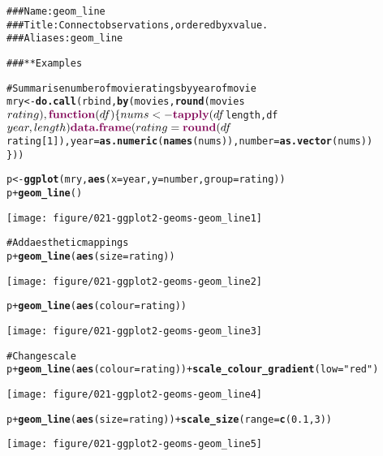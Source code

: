 \documentclass[a4paper,titlepage]{tufte-handout}\usepackage{graphicx, color}
\makeatletter
\def\maxwidth{ %
  \ifdim\Gin@nat@width>\linewidth
    \linewidth
  \else
    \Gin@nat@width
  \fi
}
\newcommand{\hlfunctioncall}[1]{\textcolor[rgb]{0.501960784313725,0,0.329411764705882}{\textbf{#1}}}%
\newcommand{\hlstring}[1]{\textcolor[rgb]{0.6,0.6,1}{#1}}%
\newcommand{\hlcomment}[1]{\textcolor[rgb]{0.180392156862745,0.6,0.341176470588235}{#1}}%
\newenvironment{kframe}{%
 \def\at@end@of@kframe{}%
 \ifinner\ifhmode%
  \def\at@end@of@kframe{\end{minipage}}%
  \begin{minipage}{\columnwidth}%
 \fi\fi%
 \def\FrameCommand##1{\hskip\@totalleftmargin \hskip-\fboxsep
 \colorbox{shadecolor}{##1}\hskip-\fboxsep
     \hskip-\linewidth \hskip-\@totalleftmargin \hskip\columnwidth}%
 \MakeFramed {\advance\hsize-\width
   \@totalleftmargin\z@ \linewidth\hsize
   \@setminipage}}%
 {\par\unskip\endMakeFramed%
 \at@end@of@kframe}
\newenvironment{knitrout}{}{} %
\makeatother
\begin{document}
\begin{knitrout}
\color{fgcolor}\begin{kframe}
\begin{alltt}
\hlcomment{### Name: geom_line}
\hlcomment{### Title: Connect observations, ordered by x value.}
\hlcomment{### Aliases: geom_line}

\hlcomment{### ** Examples}

\hlcomment{# Summarise number of movie ratings by year of movie}
mry <- \hlfunctioncall{do.call}(rbind, \hlfunctioncall{by}(movies, \hlfunctioncall{round}(movies$rating), \hlfunctioncall{function}(df) \{
  nums <- \hlfunctioncall{tapply}(df$length, df$year, length)
  \hlfunctioncall{data.frame}(rating=\hlfunctioncall{round}(df$rating[1]), year = \hlfunctioncall{as.numeric}(\hlfunctioncall{names}(nums)), number=\hlfunctioncall{as.vector}(nums))
\}))

p <- \hlfunctioncall{ggplot}(mry, \hlfunctioncall{aes}(x=year, y=number, group=rating))
p + \hlfunctioncall{geom_line}()
\end{alltt}
\end{kframe}
\texttt{[image: figure/021-ggplot2-geoms-geom\_line1]} 
\begin{kframe}\begin{alltt}

\hlcomment{# Add aesthetic mappings}
p + \hlfunctioncall{geom_line}(\hlfunctioncall{aes}(size = rating))
\end{alltt}
\end{kframe}
\texttt{[image: figure/021-ggplot2-geoms-geom\_line2]} 
\begin{kframe}\begin{alltt}
p + \hlfunctioncall{geom_line}(\hlfunctioncall{aes}(colour = rating))
\end{alltt}
\end{kframe}
\texttt{[image: figure/021-ggplot2-geoms-geom\_line3]} 
\begin{kframe}\begin{alltt}

\hlcomment{# Change scale}
p + \hlfunctioncall{geom_line}(\hlfunctioncall{aes}(colour = rating)) + \hlfunctioncall{scale_colour_gradient}(low=\hlstring{"red"})
\end{alltt}
\end{kframe}
\texttt{[image: figure/021-ggplot2-geoms-geom\_line4]} 
\begin{kframe}\begin{alltt}
p + \hlfunctioncall{geom_line}(\hlfunctioncall{aes}(size = rating)) + \hlfunctioncall{scale_size}(range = \hlfunctioncall{c}(0.1, 3))
\end{alltt}
\end{kframe}
\texttt{[image: figure/021-ggplot2-geoms-geom\_line5]} 
\begin{kframe}\begin{alltt}


\end{alltt}
\end{kframe}
\end{knitrout}
\end{document}
